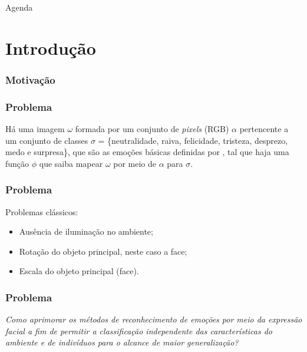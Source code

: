 \documentclass{beamer}
\date{Manaus, 30 de Julho de 2018}
\begin{document}
\begin{frame}
 \maketitle
\end{frame}

\begin{frame}{Agenda}
  \tableofcontents
\end{frame}

\section{Introdução}

\begin{frame}
\frametitle{Motivação}
\pause


\end{frame}


\begin{frame}
\frametitle{Problema}
\pause
Há uma imagem $\omega$ formada por um conjunto de \textit{pixels} (RGB) $\alpha$ pertencente a um conjunto de classes $\sigma$ = \{neutralidade, raiva, felicidade, tristeza, desprezo, medo e surpresa\}, que são as emoções básicas definidas por \citep{ekman1994}, tal que haja uma função $\phi$ que saiba mapear $\omega$ por meio de $\alpha$ para $\sigma$.  



\end{frame}


\begin{frame}
\frametitle{Problema}
Problemas clássicos:

\begin{itemize}
\pause
 \item Ausência de iluminação no ambiente;
 \pause
 \item Rotação do objeto principal, neste caso a face;
 \pause
 \item Escala do objeto principal (face).
\end{itemize}

\end{frame}

\begin{frame}
\frametitle{Problema}
\pause
\textit{Como aprimorar os métodos de reconhecimento de emoções por meio da expressão facial a fim de permitir a classificação independente das características do ambiente e de indivíduos para o alcance de maior generalização?} 


\end{frame}
\end{document}
